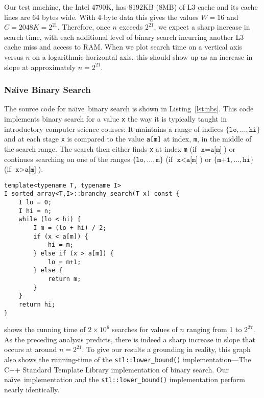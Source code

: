 \documentclass{patmorin}
\newcommand{\lstlabel}[1]{\label{lst:#1}}
\newcommand{\lstref}[1]{Listing~\ref{lst:#1}}
\newcommand{\naive}{na\"{\i}ve}
\begin{document}
Our test machine, the Intel 4790K, has 8192KB (8MB) of L3 cache and its
cache lines are 64 bytes wide.  With 4-byte data this gives the values
$W=16$ and $C=2048K=2^{21}$.  Therefore, once $n$ exceeds $2^{21}$,
we expect a sharp increase in search time, with each additional level
of binary search incurring another L3 cache miss and access to RAM.
When we plot search time on a vertical axis versus $n$ on a logarithmic
horizontal axis, this should show up as an increase in slope at
approximately $n=2^{21}$.  

\subsubsection{Na\"{\i}ve Binary Search}

The source code for \naive\ binary search is shown in
\lstref{nbs}. This code implements binary search for a
value \texttt{x} the way it is typically taught in
introductory computer science courses: It maintains a range of indices
$\{\texttt{lo},\ldots,\texttt{hi}\}$ and at each stage
\texttt{x} is compared to the value \texttt{a[m]} at
index, \texttt{m}, in the middle of the search range. The search
then either finds \texttt{x} at index \texttt{m} (if
$\texttt{x}=\texttt{a[m]}$) or continues searching on
one of the ranges $\{\texttt{lo},\ldots,\texttt{m}\}$
(if $\texttt{x}<\texttt{a[m]}$) or
$\{\texttt{m+1},\ldots,\texttt{hi}\}$ (if
$\texttt{x}>\texttt{a[m]}$).

\begin{listing}
\begin{verbatim}
template<typename T, typename I>
I sorted_array<T,I>::branchy_search(T x) const {
    I lo = 0;
    I hi = n;
    while (lo < hi) {
        I m = (lo + hi) / 2;
        if (x < a[m]) {
            hi = m;
        } else if (x > a[m]) {
            lo = m+1;
        } else {
            return m;
        }
    }
    return hi;
}
\end{verbatim}
\caption{Source code for \naive\ binary search.}
\lstlabel{nbs}
\end{listing}


 shows the running time of $2\times 10^6$ searches
for values of $n$ ranging from 1 to $2^{27}$. As the preceding analysis
predicts, there is indeed a sharp increase in slope that occurs at around
$n=2^{21}$.  To give our results a grounding in reality, this graph
also shows the running-time of the \texttt{stl::lower_bound()}
implementation---The C++ Standard Template Library implementation
of binary search.  Our \naive\ implementation and the
\texttt{stl::lower_bound()} implementation perform nearly
identically.
\end{document}

